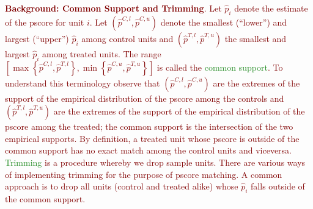 \noindent \textcolor{Maroon}{\textbf{Background: Common Support and Trimming}. Let $\widehat{p}_i$ denote the estimate of the pscore for unit $i$. Let $\left(\widehat{p}^{C,l},\widehat{p}^{C,u}\right)$ denote the smallest (``lower'') and largest (``upper'') $\widehat{p}_{i}$ among control units and $\left(\widehat{p}^{T,l},\widehat{p}^{T,u}\right) $ the smallest and largest $\widehat{p}_{i}$ among treated units. The range $\left[\max \left\{ \widehat{p}^{C,l},\widehat{p}^{T,l}\right\},\min \left\{ \widehat{p}^{C,u},\widehat{p}^{T,u}\right\} \right] $ is called the \textcolor{ForestGreen}{common support}. To understand this terminology observe that $\left(\widehat{p}^{C,l},\widehat{p}^{C,u}\right)$ are the extremes of the support of the empirical distribution of the pscore among the controls and $\left(\widehat{p}^{T,l},\widehat{p}^{T,u}\right) $ are the extremes of the support of the empirical distribution of the pscore among the treated; the common support is the intersection of the two empirical supports. By definition, a treated unit whose pscore is outside of the common support has no exact match among the control units and viceversa. \textcolor{ForestGreen}{Trimming} is a procedure whereby we drop sample units. There are various ways of implementing trimming for the purpose of pscore matching. A common approach is to drop all units (control and treated alike) whose $\widehat{p}_{i}$ falls outside of the common support.}
